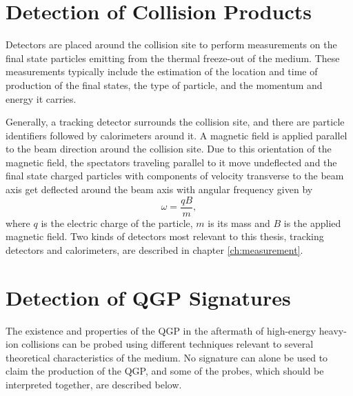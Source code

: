 \section{Detection of Collision Products}\label{subsection:detection}
Detectors are placed around the collision site to perform measurements on the final state particles emitting from the thermal freeze-out of the medium. These measurements typically include the estimation of the location and time of production of the final states, the type of particle, and the momentum and energy it carries.

Generally, a tracking detector surrounds the collision site, and there are particle identifiers followed by calorimeters around it. A magnetic field is applied parallel to the beam direction around the collision site. Due to this orientation of the magnetic field, the spectators traveling parallel to it move undeflected and the final state charged particles with components of velocity transverse to the beam axis get deflected around the beam axis with angular frequency given by
\begin{equation}\label{eqn:larmor}
\omega = \frac{qB}{m},
\end{equation}
where $q$ is the electric charge of the particle, $m$ is its mass and $B$ is the applied magnetic field.
Two kinds of detectors most relevant to this thesis, tracking detectors and calorimeters, are described in chapter \ref{ch:measurement}.

\section{Detection of QGP Signatures}\label{section:signatures}

The existence and properties of the QGP in the aftermath of high-energy heavy-ion collisions can be probed using different techniques relevant to several theoretical characteristics of the medium. No signature can alone be used to claim the production of the QGP, and some of the probes, which should be interpreted together, are described below.



